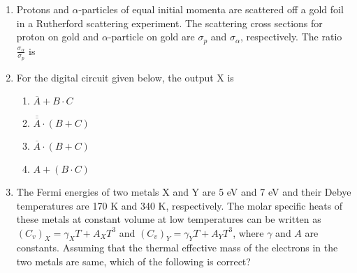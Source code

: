 \documentclass{article}
\newcommand{\brak}[1]{\left( #1 \right)}
\begin{document}
\begin{enumerate}
    \item Protons and $\alpha$-particles of equal initial momenta are scattered off a gold foil in a Rutherford scattering experiment. The scattering cross sections for proton on gold and  
 $\alpha$-particle on gold are $\sigma_p$ and $\sigma_{\alpha}$, respectively. The ratio  
 $\frac{\sigma_{\alpha}}{\sigma_p}$ is \underline{\hspace{2cm}}

 \item For the digital circuit given below, the output X is

    \begin{figure}[!ht]
\centering
{}%

\label{fig:my_label}
\end{figure}

    \begin{enumerate}
        \item $\overline{A} + B \cdot C$
        \item $\overline{\overline{A}} \cdot \brak{B + C}$
        \item $\overline{A} \cdot \brak{B + C}$
        \item $A + \brak{B \cdot C}$
    \end{enumerate}

    \item The Fermi energies of two metals X and Y are 5 eV and 7 eV and their Debye temperatures are 170 K and 340 K, respectively. The molar specific heats of these metals at constant volume at low temperatures can be written as $\brak{C_v}_X = \gamma_X T + A_X T^3$ and $\brak{C_v}_Y = \gamma_Y T + A_Y T^3$, where $\gamma$ and $A$ are constants. Assuming that the thermal effective mass of the electrons in the two metals are same, which of  
 the following is correct?


\end{enumerate}
\end{document}
